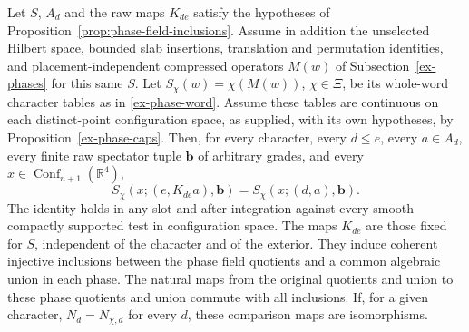 \begin{proposition}
\label{prop:phase-inclusion-every-character}
Let $S$, $A_d$ and the raw maps $K_{de}$ satisfy the hypotheses of
Proposition~\ref{prop:phase-field-inclusions}. Assume in addition the
unselected Hilbert space, bounded slab insertions, translation and
permutation identities, and placement-independent compressed operators
$M(w)$ of Subsection~\ref{ex-phases} for this same $S$. Let
$S_\chi(w)=\chi(M(w))$, $\chi\in\Xi$, be its whole-word character
tables as in \eqref{ex-phase-word}. Assume these tables are continuous
on each distinct-point configuration space, as supplied, with its own
hypotheses, by Proposition~\ref{ex-phase-caps}.
Then, for every character, every $d\le e$, every $a\in A_d$, every
finite raw spectator tuple $\boldsymbol b$ of arbitrary grades, and every
$x\in\operatorname{Conf}_{n+1}(\mathbb R^4)$,
\begin{equation}\label{eq:phase-inclusion-character}
 S_\chi(x;(e,K_{de}a),\boldsymbol b)
       =S_\chi(x;(d,a),\boldsymbol b).
\end{equation}
The identity holds in any slot and after integration against every smooth
compactly supported test in configuration space. The maps $K_{de}$ are
those fixed for $S$, independent of the character and of the exterior.
They induce coherent injective inclusions between the phase field
quotients and a common algebraic union in each phase. The natural maps
from the original quotients and union to these phase quotients and union
commute with all inclusions. If, for a given character,
$N_d=N_{\chi,d}$ for every $d$, these comparison maps are isomorphisms.
\end{proposition}
